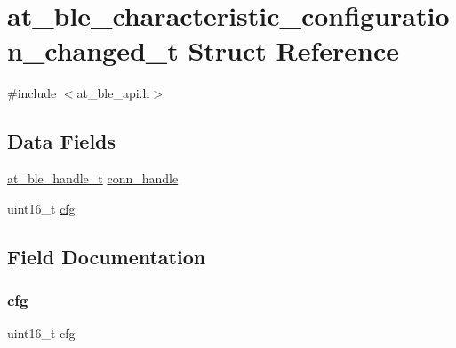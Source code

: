 \hypertarget{structat__ble__characteristic__configuration__changed__t}{}\section{at\+\_\+ble\+\_\+characteristic\+\_\+configuration\+\_\+changed\+\_\+t Struct Reference}
\label{structat__ble__characteristic__configuration__changed__t}


{\ttfamily \#include $<$at\+\_\+ble\+\_\+api.\+h$>$}

\subsection*{Data Fields}
\begin{DoxyCompactItemize}
\item 
\mbox{\hyperlink{at__ble__api_8h_abd23646d0c662860741f787efc8456f2}{at\+\_\+ble\+\_\+handle\+\_\+t}} \mbox{\hyperlink{structat__ble__characteristic__configuration__changed__t_ae42df6fd8493f8f8faeccfdd6062e96f}{conn\+\_\+handle}}
\item 
uint16\+\_\+t \mbox{\hyperlink{structat__ble__characteristic__configuration__changed__t_adcf9dc6ef21d85e6458b6bee7ca8e7f6}{cfg}}
\end{DoxyCompactItemize}


\subsection{Field Documentation}
\mbox{\label{structat__ble__characteristic__configuration__changed__t_adcf9dc6ef21d85e6458b6bee7ca8e7f6}} 
\subsubsection{\texorpdfstring{cfg}{cfg}}
{\footnotesize\ttfamily uint16\+\_\+t cfg}

\mbox{\label{structat__ble__characteristic__configuration__changed__t_ae42df6fd8493f8f8faeccfdd6062e96f}} 
